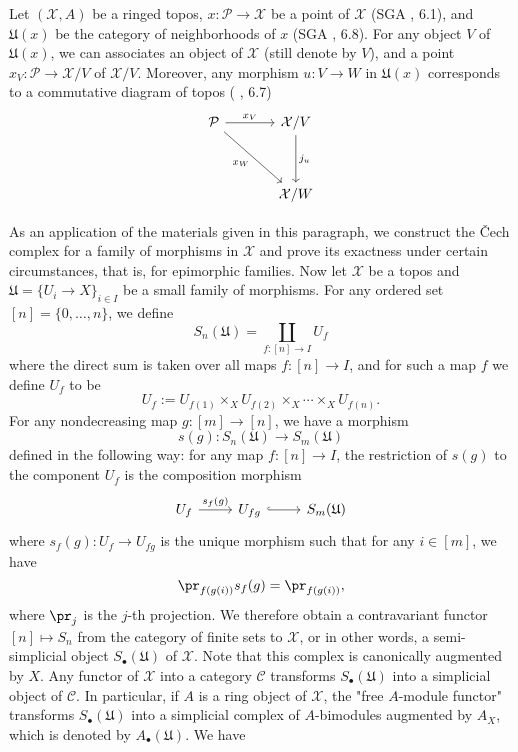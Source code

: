 Let $(\mathcal{X},A)$ be a ringed topos, $x:\mathcal{P}\to \mathcal{X}$ be a point of $\mathcal{X}$ (SGA , 6.1), and $\mathfrak{U}(x)$ be the category of neighborhoods of $x$ (SGA , 6.8). For any object $V$ of $\mathfrak{U}(x)$, we can associates an object of $\mathcal{X}$ (still denote by $V$), and a point $x_V:\mathcal{P}\to \mathcal{X}/V$ of $\mathcal{X}/V$. Moreover, any morphism $u:V\to W$ in $\mathfrak{U}(x)$ corresponds to a commutative diagram of topos (\cite{SGA4-1} , 6.7)
\[\begin{tikzcd}[row sep=12mm,column sep=12mm]
\mathcal{P}\ar[rd,swap,"x_W"]\ar[r,"x_V"]&\mathcal{X}/V\ar[d,"j_u"]\\
&\mathcal{X}/W
\end{tikzcd}\]

As an application of the materials given in this paragraph, we construct the \v{C}ech complex for a family of morphisms in $\mathcal{X}$ and prove its exactness under certain circumstances, that is, for epimorphic families. Now let $\mathcal{X}$ be a topos and $\mathfrak{U}=\{U_i\to X\}_{i\in I}$ be a small family of morphisms. For any ordered set $[n]=\{0,\dots,n\}$, we define
\[S_n(\mathfrak{U})=\coprod_{f:[n]\to I}U_f\]
where the direct sum is taken over all maps $f:[n]\to I$, and for such a map $f$ we define $U_f$ to be
\[U_f:=U_{f(1)}\times_XU_{f(2)}\times_X\cdots\times_XU_{f(n)}.\]
For any nondecreasing map $g:[m]\to [n]$, we have a morphism
\begin{equation}\label{ringed topos Cech complex for covering-1}
s(g):S_n(\mathfrak{U})\to S_m(\mathfrak{U})
\end{equation}
defined in the following way: for any map $f:[n]\to I$, the restriction of $s(g)$ to the component $U_f$ is the composition morphism
\[\begin{tikzcd}
U_f\ar[r,"s_f(g)"]&U_{fg}\ar[r,hook]&S_m(\mathfrak{U})
\end{tikzcd}\]
where $s_f(g):U_f\to U_{fg}$ is the unique morphism such that for any $i\in[m]$, we have 
\begin{equation}\label{ringed topos Cech complex for covering-2}
\pr_{f(g(i))}s_f(g)=\pr_{f(g(i))},
\end{equation}
where $\pr_j$ is the $j$-th projection. We therefore obtain a contravariant functor $[n]\mapsto S_n$ from the category of finite sets to $\mathcal{X}$, or in other words, a semi-simplicial object $S_\bullet(\mathfrak{U})$ of $\mathcal{X}$. Note that this complex is canonically augmented by $X$. Any functor of $\mathcal{X}$ into a category $\mathcal{C}$ transforms $S_\bullet(\mathfrak{U})$ into a simplicial object of $\mathcal{C}$. In particular, if $A$ is a ring object of $\mathcal{X}$, the "free $A$-module functor" transforms $S_\bullet(\mathfrak{U})$ into a simplicial complex of $A$-bimodules augmented by $A_X$, which is denoted by $A_\bullet(\mathfrak{U})$. We have

